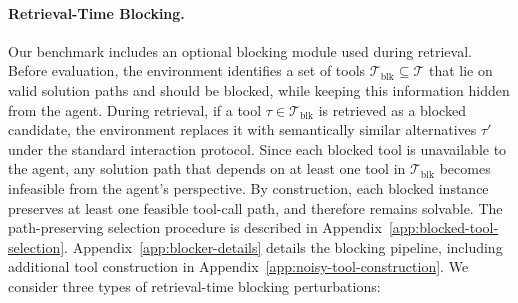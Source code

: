 \documentclass{llmxive}
\begin{document}


\paragraph{Retrieval-Time Blocking.}

Our benchmark includes an optional blocking module used during retrieval.
Before evaluation, the environment identifies a set of tools $\mathcal{T}_{\mathrm{blk}} \subseteq \mathcal{T}$ that lie on valid solution paths and should be blocked, while keeping this information hidden from the agent.
During retrieval, if a tool $\tau \in \mathcal{T}_{\mathrm{blk}}$ is retrieved as a blocked candidate, the environment replaces it with semantically similar alternatives $\tau'$ under the standard interaction protocol.
Since each blocked tool is unavailable to the agent, any solution path that depends on at least one tool in $\mathcal{T}_{\mathrm{blk}}$ becomes infeasible from the agent's perspective.
By construction, each blocked instance preserves at least one feasible tool-call path, and therefore remains solvable.
The path-preserving selection procedure is described in Appendix~\ref{app:blocked-tool-selection}.
Appendix~\ref{app:blocker-details} details the blocking pipeline, including additional tool construction in Appendix~\ref{app:noisy-tool-construction}.
We consider three types of retrieval-time blocking perturbations:
    
\end{document}
